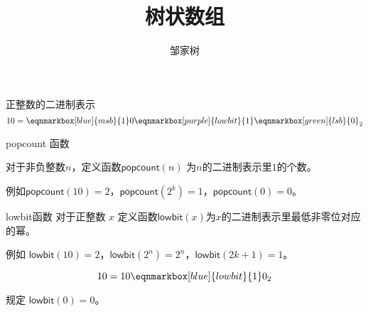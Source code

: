 \documentclass{ctexbeamer}
\title{树状数组}
\author{邹家树}
\newcommand{\lb}{\mathsf{lowbit}}
\newcommand{\popc}{\mathsf{popcount}}
\begin{document}
\maketitle

\begin{frame}{正整数的二进制表示}
\begin{equation*}
10 =
\eqnmarkbox[blue]{msb}{1}
0
\eqnmarkbox[purple]{lowbit}{1}
\eqnmarkbox[green]{lsb}{0}_2
\end{equation*}


\end{frame}


\begin{frame}{popcount 函数}

对于非负整数$n$，定义函数$\popc(n)$ 为$n$的二进制表示里$1$的个数。

例如$\popc(10) = 2$，$\popc(2^{k}) = 1$，$\popc(0) = 0$。

\end{frame}


\begin{frame}{lowbit函数}
对于正整数 $x$ 定义函数$\lb(x)$为$x$的二进制表示里最低非零位对应的幂。

\begin{block}{}
  例如 $\lb(10) = 2$，$\lb(2^{n}) = 2^{n}$，$\lb(2k+1) = 1$。
\end{block}

\begin{block}{}
  \begin{equation*}
  10 =
  1
  0
  \eqnmarkbox[blue]{lowbit}{1}
  0_2
  \end{equation*}
\end{block}

规定 $\lb(0) = 0$。
\end{frame}
\end{document}
